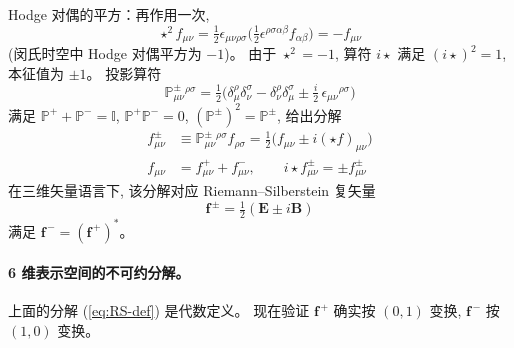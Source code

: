Hodge 对偶的平方：再作用一次,
\begin{equation}
    \star^2 f_{\mu\nu} = \tfrac{1}{2}\epsilon_{\mu\nu\rho\sigma}
    \bigl(\tfrac{1}{2}\epsilon^{\rho\sigma\alpha\beta} f_{\alpha\beta}\bigr)
    = -f_{\mu\nu}
    \label{eq:hodge-squared}
\end{equation}
(闵氏时空中 Hodge 对偶平方为 $-1$)。
由于 $\star^2=-1$, 算符 $i\star$ 满足 $(i\star)^2=1$, 本征值为 $\pm 1$。
投影算符
\begin{equation}
    \mathbb{P}^\pm_{\mu\nu}{}^{\rho\sigma}
    = \tfrac{1}{2}\bigl(
    \delta^\rho_\mu\delta^\sigma_\nu - \delta^\rho_\nu\delta^\sigma_\mu
    \pm \tfrac{i}{2}\,\epsilon_{\mu\nu}{}^{\rho\sigma}\bigr)
\end{equation}
满足 $\mathbb{P}^++\mathbb{P}^-=\mathbb{I}$,
$\mathbb{P}^+\mathbb{P}^-=0$, $(\mathbb{P}^\pm)^2=\mathbb{P}^\pm$,
给出分解
\begin{subequations}\label{eq:f-pm-decomp}
\begin{align}
    f^\pm_{\mu\nu} &\equiv \mathbb{P}^\pm_{\mu\nu}{}^{\rho\sigma} f_{\rho\sigma}
    = \tfrac{1}{2}\bigl(f_{\mu\nu} \pm i(\star f)_{\mu\nu}\bigr) \\
    f_{\mu\nu} &= f^+_{\mu\nu} + f^-_{\mu\nu}, \qquad
    i\star f^\pm_{\mu\nu} = \pm f^\pm_{\mu\nu}
\end{align}
\end{subequations}
在三维矢量语言下, 该分解对应 Riemann--Silberstein 复矢量
\begin{equation}
    \boldsymbol{f}^{\,\pm} = \tfrac{1}{2}(\boldsymbol{E} \pm i\boldsymbol{B})
    \label{eq:RS-def}
\end{equation}
满足 $\boldsymbol{f}^{\,-}=(\boldsymbol{f}^{\,+})^*$。


\paragraph*{6 维表示空间的不可约分解。}
上面的分解 (\ref{eq:RS-def}) 是代数定义。
现在验证 $\boldsymbol{f}^{\,+}$ 确实按 $(0,1)$ 变换, 
$\boldsymbol{f}^{\,-}$ 按 $(1,0)$ 变换。

